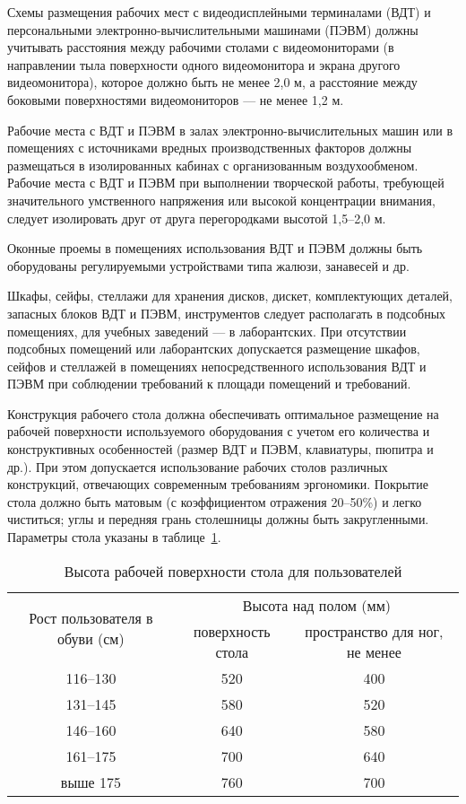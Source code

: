 Схемы размещения рабочих мест с видеодисплейными терминалами (ВДТ) и персональными электронно-вычислительными машинами (ПЭВМ) должны учитывать расстояния между рабочими столами с видеомониторами (в направлении тыла поверхности одного видеомонитора и экрана другого видеомонитора), которое должно быть не менее 2,0 м, а расстояние между боковыми поверхностями видеомониторов --- не менее 1,2 м.

Рабочие места с ВДТ и ПЭВМ в залах электронно-вычислительных машин или в помещениях с источниками вредных производственных факторов должны размещаться в изолированных кабинах с организованным воздухообменом. Рабочие места с ВДТ и ПЭВМ при выполнении творческой работы, требующей значительного умственного напряжения или высокой концентрации внимания, следует изолировать друг от друга перегородками высотой 1,5--2,0 м.

Оконные проемы в помещениях использования ВДТ и ПЭВМ должны быть оборудованы регулируемыми устройствами типа жалюзи, занавесей и др.

Шкафы, сейфы, стеллажи для хранения дисков, дискет, комплектующих деталей, запасных блоков ВДТ и ПЭВМ, инструментов следует располагать в подсобных помещениях, для учебных заведений --- в лаборантских. При отсутствии подсобных помещений или лаборантских допускается размещение шкафов, сейфов и стеллажей в помещениях непосредственного использования ВДТ и ПЭВМ при соблюдении требований к площади помещений и требований.

Конструкция рабочего стола должна обеспечивать оптимальное размещение на рабочей поверхности используемого оборудования с учетом его количества и конструктивных особенностей (размер ВДТ и ПЭВМ, клавиатуры, пюпитра и др.). При этом допускается использование рабочих столов различных конструкций, отвечающих современным требованиям эргономики. Покрытие стола должно быть матовым (с коэффициентом отражения 20--50\%) и легко чиститься; углы и передняя грань столешницы должны быть закругленными. Параметры стола указаны в таблице~\ref{tab:table_height}.
\begin{table}\begin{center}
\caption{Высота рабочей поверхности стола для пользователей}
\label{tab:table_height}
\begin{tabular}{|c|c|c|}
\hline
\multirow{3}{2.5cm}{Рост пользователя в обуви (см)}
& \multicolumn{2}{|c|}{Высота над полом (мм)} \\
\cline{2-3}
&\multirow{2}{2.5cm}{поверхность стола}&\multirow{2}{4cm}{пространство для ног, не менее}\\
&&\\
\hline
116--130 & 520 & 400 \\
\hline
131--145 & 580 & 520 \\
\hline
146--160 & 640 & 580 \\
\hline
161--175 & 700 & 640 \\
\hline
выше 175 & 760 & 700 \\
\hline
\end{tabular}\end{center}\end{table}


